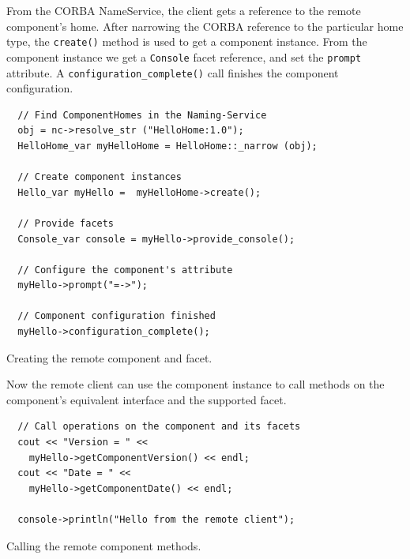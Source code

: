 From the CORBA NameService, the client gets a reference to the 
remote component's home. 
After narrowing the CORBA reference to the particular home type, 
the {\tt create()} method is used to get a component instance.
From the component instance we get a {\tt Console} facet reference, 
and set the {\tt prompt} attribute. 
A {\tt configuration\_complete()} call finishes the component 
configuration.

\begin{Example}
\begin{minifbox}
\begin{small}
\begin{verbatim}
  // Find ComponentHomes in the Naming-Service
  obj = nc->resolve_str ("HelloHome:1.0");
  HelloHome_var myHelloHome = HelloHome::_narrow (obj);

  // Create component instances
  Hello_var myHello =  myHelloHome->create();

  // Provide facets   
  Console_var console = myHello->provide_console();
	
  // Configure the component's attribute
  myHello->prompt("=->");

  // Component configuration finished	
  myHello->configuration_complete();
\end{verbatim}
\end{small}
\end{minifbox}
\caption{Creating the remote component and facet.}
\label{CreatingRemoteComponent}
\end{Example}

\noindent 
Now the remote client can use the component instance to call methods on
the component's equivalent interface and the supported facet.
\begin{Example}
\begin{minifbox}
\begin{small}
\begin{verbatim}
  // Call operations on the component and its facets
  cout << "Version = " << 
    myHello->getComponentVersion() << endl;
  cout << "Date = " << 
    myHello->getComponentDate() << endl;

  console->println("Hello from the remote client");
\end{verbatim}
\end{small}
\end{minifbox}
\caption{Calling the remote component methods.}
\label{RemoteMethodCalling}
\end{Example}

